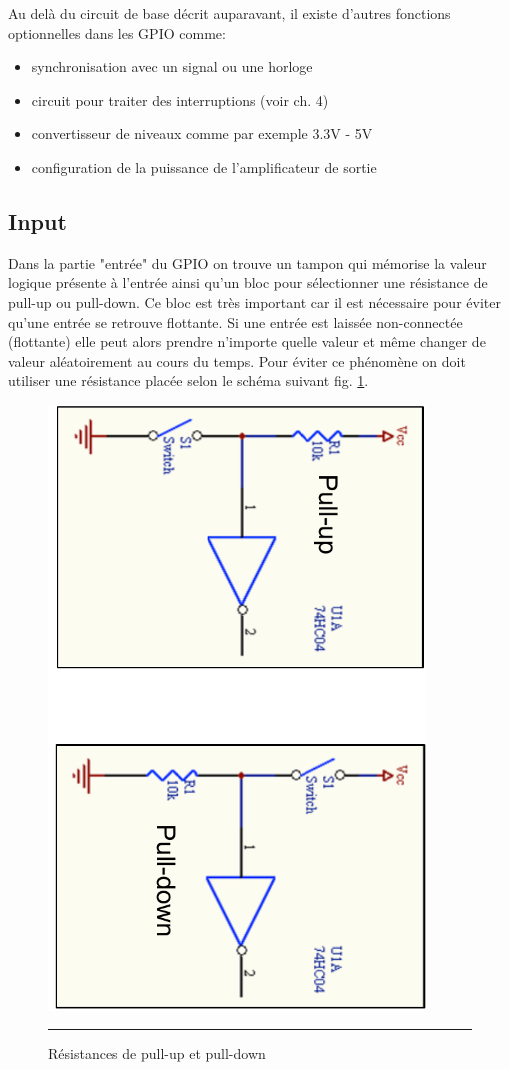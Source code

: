 Au delà du circuit de base décrit auparavant, il existe d'autres fonctions optionnelles dans les GPIO comme:
\begin{itemize}[label=\textbullet,font=\small]
\item synchronisation avec un signal ou une horloge 
\item circuit pour traiter des interruptions (voir ch. 4)
\item convertisseur de niveaux comme par exemple 3.3V - 5V
\item configuration de la puissance de l'amplificateur de sortie
\end{itemize}

\subsection{Input}

Dans la partie "entrée" du GPIO on trouve un tampon qui mémorise la valeur logique présente à l'entrée ainsi qu'un bloc pour sélectionner une résistance de pull-up ou pull-down. Ce bloc est très important car il est nécessaire pour éviter qu'une entrée se retrouve flottante. Si une entrée est laissée non-connectée (flottante) elle peut alors prendre n'importe quelle valeur et même changer de valeur aléatoirement au cours du temps. Pour éviter ce phénomène on doit utiliser une résistance placée selon le schéma suivant fig. \ref{fig:pullres}.

\begin{figure}[htb]
  \centering
  \includegraphics[angle=90, width=10cm]{./Figures/gpio/pullres.pdf}
  \rule{35em}{0.5pt}
  \caption[res pull]{Résistances de pull-up et pull-down}
  \label{fig:pullres}
\end{figure}

